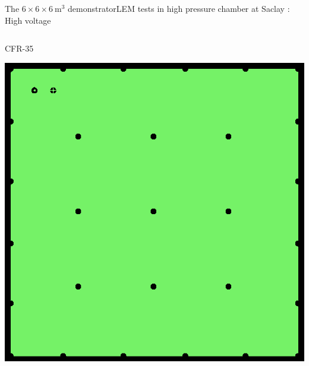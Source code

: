 \documentclass[10pt]{beamer}
\begin{document}
\begin{frame}{The \texorpdfstring{$6 \times 6 \times \SI{6}{\meter\cubed}$}{666} demonstrator}{LEM tests in high pressure chamber at Saclay : High voltage}
\begin{columns}
\begin{column}{0.5\textwidth}
    			\begin{minipage}{0.48\textwidth}
    				\centering
    				\begin{scriptsize}
	    				CFR-35
    				\end{scriptsize}
    				\includegraphics[width=.9\textwidth]{figures/666/CFR-35.png}
    			\end{minipage}
    		\end{column}
    	\end{columns}
    \end{frame}
    
\end{document}
